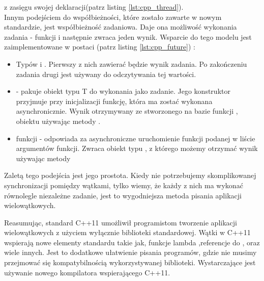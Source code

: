 \documentclass[document.tex]{subfiles}
\begin{document}
z zasięgu swojej deklaracji(patrz listing \ref{lst:cpp_thread}).\cite{C++11_iso}\cite{C++11_tutorial}
\\

\clearpage
\indent Innym podejściem do współbieżności, które zostało zawarte w nowym standardzie,
jest współbieżność zadaniowa. Daje ona możliwość wykonania zadania - funkcji i  następnie zwraca
jeden wynik. Wsparcie do tego modelu jest zaimplementowane w postaci\cite{C++_ref}\cite{C++_Meyers}
(patrz listing \ref{lst:cpp_future}) :
\begin{itemize}
\item Typów  i . Pierwszy z nich zawierać będzie wynik 
zadania. Po zakończeniu zadania drugi jest używany do odczytywania tej wartości. 
\item {} - pakuje obiekt typu T do wykonania jako zadanie. Jego konstruktor
przyjmuje przy inicjalizacji funkcję, która ma zostać wykonana asynchronicznie. Wynik otrzymywany ze
stworzonego na bazie funkcji , obiektu  używając metody .
\item funkcji  - odpowiada za asynchroniczne uruchomienie funkcji podanej w liście argumentów funkcji. 
Zwraca obiekt typu , z którego możemy otrzymać wynik używając metody 
\end{itemize}


 
Zaletą tego podejścia jest jego prostota. Kiedy nie potrzebujemy skomplikowanej synchronizacji pomiędzy wątkami,
tylko wiemy, że każdy z nich ma wykonać równolegle niezależne zadanie, jest to wygodniejsza
 metoda pisania aplikacji wielowątkowych. 
\cite{C++_Meyers}\cite{C++_Stroustrup}

\indent Reasumując, standard C++11 umożliwił programistom tworzenie 
aplikacji wielowątkowych z użyciem wyłącznie biblioteki standardowej.
Wątki w C++11 wspierają nowe elementy standardu takie jak, 
funkcje lambda ,referencje do ,  oraz wiele innych. Jest to dodatkowe ułatwienie pisania programów, gdzie nie musimy
przejmować się kompatybilnością wykorzystywanej biblioteki. Wystarczające 
jest używanie nowego kompilatora wspierającego C++11. 
\end{document}
